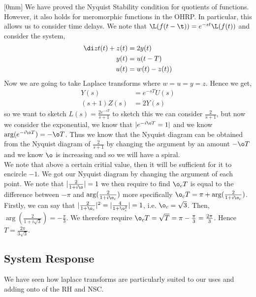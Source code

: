 \begin{eg}[0mm]
  We have proved the Nyquist Stability condition for quotients of functions. However, it also holds for meromorphic functions in the OHRP. In particular, this allows us to consider time delays. We note that $\L(f(t - \t)) = e^{-st}\L(f(t))$ and consider the system,
  \begin{align*}
    \di z t (t) + z(t) &= 2y(t)\\
    y(t) &= u(t - T)\\
    u(t) &= w(t) - z(t))\\
  \end{align*}
  Now we are going to take Laplace transforms where $w = u = y = z$. Hence we get,
  \begin{align*}
    Y(s) &= e^{-sT}U(s)\\
    (s+1)Z(s) &= 2Y(s)
  \end{align*}
  so we want to sketch $L(s) = \frac{2e^{-sT}}{s + 1}$ to sketch this we can consider $\frac{2}{s+1}$, but now we consider the exponential, we know that $|e^{-i\o T} = 1|$ and we know $\arg(e^{-i\o T}) = - \o T$. Thus we know that the Nyquist diagram can be obtained from the Nyquist diagram of $\frac{2}{s+1}$ by changing the argument by an amount $-\o T$ and we know $\o$ is increasing and so we will have a spiral. \\

  We note that above a certain critial value, then it will be sufficient for it to encircle $-1$. We got our Nyquist diagram by changing the argument of each point. We note that $|\frac{2}{1 + i \o}| = 1$ we then require to find $\o_c T$ is equal to the difference between $- \pi$ and $\arg(\frac{2}{1 + i\o_c})$ more specifically $\o_c T = \pi + \arg(\frac{2}{1 + i\o_c})$.\\

  Firstly, we can say that $|\frac{2}{1 + \o_c}|^2 = |\frac{4}{1 + \o_c^2}| = 1$, i.e. $\o_c = \sqrt 3$. Then, $\arg(\frac{2}{1 + i\sqrt 3}) = -\frac{\pi }{3}$. We therefore require $\o_cT = \sqrt T = \pi - \frac{\pi }{3} = \frac{2\pi }{3}$. Hence $T = \frac{2\pi}{3 \sqrt 3}$.
\end{eg}

\subsection{System Response}
We have seen how laplace transforms are particularly suited to our uses and adding onto of the RH and NSC. \\

